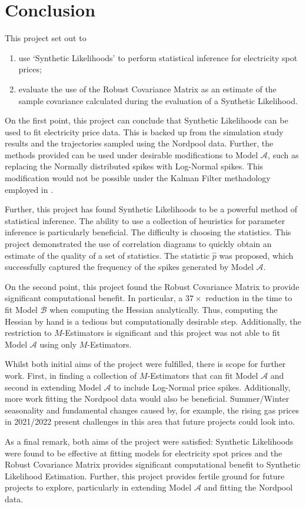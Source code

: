 \section{Conclusion}
\label{sec:eval}

This project set out to

\begin{enumerate}
    \item use `Synthetic Likelihoods' \citep{wood_2010} to perform statistical inference for electricity spot prices;
    \item evaluate the use of the Robust Covariance Matrix \citep{huber_1967} as an estimate of the sample covariance calculated during the evaluation of a Synthetic Likelihood.
\end{enumerate}

On the first point, this project can conclude that Synthetic Likelihoods can be used to fit electricity price data. This is backed up from the simulation study results and the trajectories sampled using the Nordpool data. Further, the methods provided can be used under desirable modifications to Model $\mathcal{A}$, such as replacing the Normally distributed spikes with Log-Normal spikes. This modification would not be possible under the Kalman Filter methadology employed in \cite{huisman_mahieu_2003}.

Further, this project has found Synthetic Likelihoods to be a powerful method of statistical inference. The ability to use a collection of heuristics for parameter inference is particularly beneficial. The difficulty is choosing the statistics. This project demonstrated the use of correlation diagrams to quickly obtain an estimate of the quality of a set of statistics. The statistic $\hat{p}$ was proposed, which successfully captured the frequency of the spikes generated by Model $\mathcal{A}$.

On the second point, this project found the Robust Covariance Matrix to provide significant computational benefit. In particular, a $37 \times$ reduction in the time to fit Model $\mathcal{B}$ when computing the Hessian analytically. Thus, computing the Hessian by hand is a tedious but computationally desirable step. Additionally, the restriction to $M$-Estimators is significant and this project was not able to fit Model $\mathcal{A}$ using only $M$-Estimators.

Whilst both initial aims of the project were fulfilled, there is scope for further work. First, in finding a collection of $M$-Estimators that can fit Model $\mathcal{A}$ and second in extending Model $\mathcal{A}$ to include Log-Normal price spikes. Additionally, more work fitting the Nordpool data would also be beneficial. Summer/Winter seasonality and fundamental changes caused by, for example, the rising gas prices in 2021/2022 present challenges in this area that future projects could look into.

As a final remark, both aims of the project were satisfied: Synthetic Likelihoods were found to be effective at fitting models for electricity spot prices and the Robust Covariance Matrix provides significant computational benefit to Synthetic Likelihood Estimation. Further, this project provides fertile ground for future projects to explore, particularly in extending Model $\mathcal{A}$ and fitting the Nordpool data.
